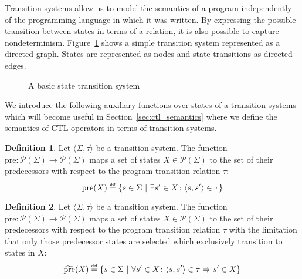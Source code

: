 \documentclass[11pt,a4paper,titlepage]{article}
\theoremstyle{definition}
\newtheorem{definition}{Definition}[section]
\newcommand\eqdef{\mathrel{\overset{\makebox[0pt]{\mbox{\normalfont\tiny\sffamily def}}}{=}}}
\begin{document}
Transition systems allow us to model the semantics of a program 
independently of the programming language in which it was written. 
By expressing the possible transition between states in terms of a relation, 
it is also possible to capture nondeterminism. Figure~\ref{fig:basic_transition_system} 
shows a simple transition system represented as a directed graph. States are represented as nodes
and state transitions as directed edges.
\\

\begin{figure}
\centering
{}
\caption{A basic state transition system} 
\label{fig:basic_transition_system}
\end{figure}


We introduce the following auxiliary functions over states of a transition systems which will become 
useful in Section~\ref{sec:ctl_semantics} where we define the semantics of CTL operators in terms of transition systems.

\begin{definition}\label{def:pre}
    Let $\langle \Sigma, \tau \rangle$ be a transition system. The function $\text{pre} \colon \mathcal{P}(\Sigma) \to \mathcal{P}(\Sigma)$
    maps a set of states $X \in \mathcal{P}(\Sigma)$ to the set of their predecessors with respect to the program transition
    relation $\tau$:
\begin{equation}
    \text{pre}(X) \eqdef \{s \in \Sigma \ | \ \exists s' \in X \colon \langle s, s' \rangle \in \tau \}  
\end{equation}
\end{definition}


\begin{definition}\label{def:tilde_pre}
    Let $\langle \Sigma, \tau \rangle$ be a transition system. The function $\widetilde{\text{pre}} \colon \mathcal{P}(\Sigma) \to \mathcal{P}(\Sigma)$
    maps a set of states $X \in \mathcal{P}(\Sigma)$ to the set of their predecessors with respect to the program transition
    relation $\tau$ with the limitation that only those predecessor states are selected which exclusively transition to states in $X$:
\begin{equation}
    \widetilde{\text{pre}}(X) \eqdef \{s \in \Sigma \ | \ \forall s' \in X \colon \langle s, s' \rangle \in \tau \Rightarrow s' \in X \}  
\end{equation}
\end{definition}
\end{document}
